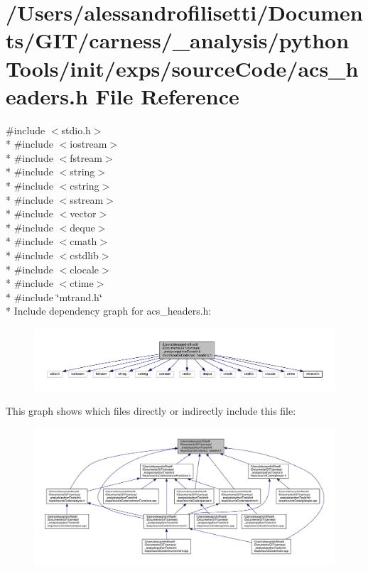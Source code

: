 \hypertarget{a00050}{\section{/\-Users/alessandrofilisetti/\-Documents/\-G\-I\-T/carness/\-\_\-analysis/python\-Tools/init/exps/source\-Code/acs\-\_\-headers.h File Reference}
\label{a00050}
}
{\ttfamily \#include $<$stdio.\-h$>$}\\*
{\ttfamily \#include $<$iostream$>$}\\*
{\ttfamily \#include $<$fstream$>$}\\*
{\ttfamily \#include $<$string$>$}\\*
{\ttfamily \#include $<$cstring$>$}\\*
{\ttfamily \#include $<$sstream$>$}\\*
{\ttfamily \#include $<$vector$>$}\\*
{\ttfamily \#include $<$deque$>$}\\*
{\ttfamily \#include $<$cmath$>$}\\*
{\ttfamily \#include $<$cstdlib$>$}\\*
{\ttfamily \#include $<$clocale$>$}\\*
{\ttfamily \#include $<$ctime$>$}\\*
{\ttfamily \#include \char`\"{}mtrand.\-h\char`\"{}}\\*
Include dependency graph for acs\-\_\-headers.\-h\-:
\nopagebreak
\begin{figure}[H]
\begin{center}
\leavevmode
\includegraphics[width=350pt]{a00160}
\end{center}
\end{figure}
This graph shows which files directly or indirectly include this file\-:
\nopagebreak
\begin{figure}[H]
\begin{center}
\leavevmode
\includegraphics[width=350pt]{a00161}
\end{center}
\end{figure}

